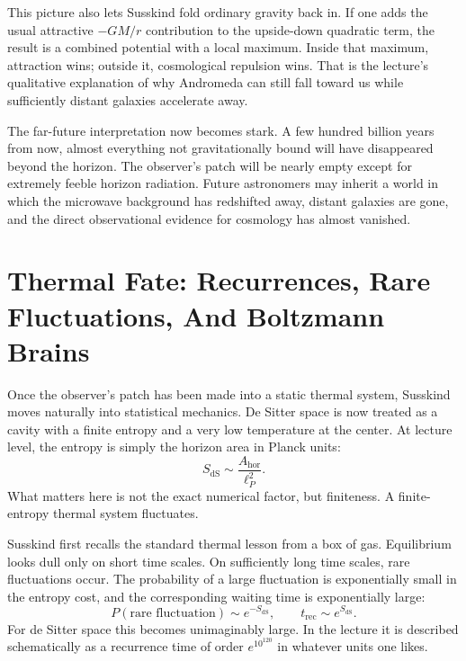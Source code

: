 This picture also lets Susskind fold ordinary gravity back in. If one adds the usual attractive \( -GM/r \) contribution to the upside-down quadratic term, the result is a combined potential with a local maximum. Inside that maximum, attraction wins; outside it, cosmological repulsion wins. That is the lecture's qualitative explanation of why Andromeda can still fall toward us while sufficiently distant galaxies accelerate away.

The far-future interpretation now becomes stark. A few hundred billion years from now, almost everything not gravitationally bound will have disappeared beyond the horizon. The observer's patch will be nearly empty except for extremely feeble horizon radiation. Future astronomers may inherit a world in which the microwave background has redshifted away, distant galaxies are gone, and the direct observational evidence for cosmology has almost vanished.

\section{Thermal Fate: Recurrences, Rare Fluctuations, And Boltzmann Brains}

Once the observer's patch has been made into a static thermal system, Susskind moves naturally into statistical mechanics. De Sitter space is now treated as a cavity with a finite entropy and a very low temperature at the center. At lecture level, the entropy is simply the horizon area in Planck units:
\begin{equation}
S_{\text{dS}}\sim \frac{A_{\text{hor}}}{\ell_P^2}.
\end{equation}
What matters here is not the exact numerical factor, but finiteness. A finite-entropy thermal system fluctuates.

Susskind first recalls the standard thermal lesson from a box of gas. Equilibrium looks dull only on short time scales. On sufficiently long time scales, rare fluctuations occur. The probability of a large fluctuation is exponentially small in the entropy cost, and the corresponding waiting time is exponentially large:
\begin{equation}
P(\text{rare fluctuation})\sim e^{-S_{\text{dS}}},
\qquad
t_{\text{rec}}\sim e^{S_{\text{dS}}}.
\end{equation}
For de Sitter space this becomes unimaginably large. In the lecture it is described schematically as a recurrence time of order \(e^{10^{120}}\) in whatever units one likes.

